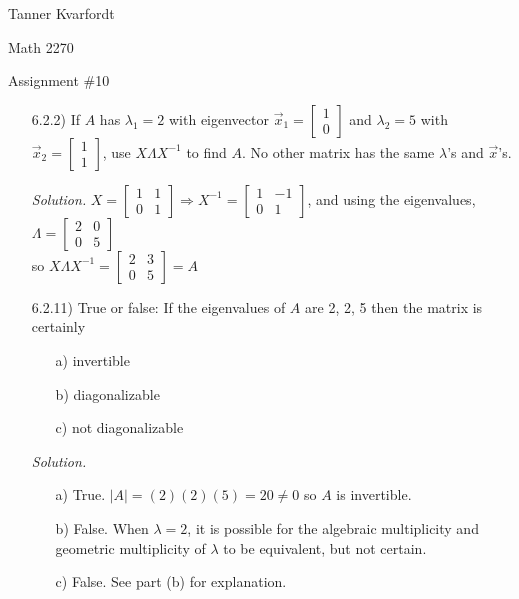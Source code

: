 \documentclass[12pt]{article}
\begin{document}
\hfill Tanner Kvarfordt

\hfill Math 2270

\hfill Assignment \#10


\begin{itemize}
\item[6.2.2)] If $A$ has $\lambda_1=2$ with eigenvector $\vec{x}_1=\begin{bmatrix}1 \\ 0\end{bmatrix}$ and
		 	  $\lambda_2=5$ with $\vec{x}_2 = \begin{bmatrix}1 \\ 1\end{bmatrix}$, use $X\Lambda X^{-1}$ to find 
              $A$.
              No other matrix has the same $\lambda$'s and $\vec{x}$'s.

\textit{Solution.}
$X=\begin{bmatrix}
1 & 1 \\ 0 & 1
\end{bmatrix}\Rightarrow
X^{-1}=\begin{bmatrix}
1 & -1 \\ 0 & 1
\end{bmatrix}$, and using the eigenvalues, $\Lambda= 
\begin{bmatrix}
2 & 0 \\ 0 & 5
\end{bmatrix}$\\
so $X\Lambda X^{-1}=\begin{bmatrix}
2 & 3 \\ 0 & 5
\end{bmatrix}=A$

\item[6.2.11)] True or false: If the eigenvalues of $A$ are 2, 2, 5 then the matrix is certainly
			   \begin{itemize}
			   \item[a)] invertible
               \item[b)] diagonalizable
               \item[c)] not diagonalizable
			   \end{itemize}

\textit{Solution.}
\begin{itemize}
\item[a)] True. $|A|=(2)(2)(5)=20\neq0$ so $A$ is invertible.
\item[b)] False. When $\lambda=2$, it is possible for the algebraic multiplicity and geometric multiplicity of $\lambda$ to be equivalent, but not certain.
\item[c)] False. See part (b) for explanation.
\end{itemize}


\end{itemize}
\end{document}
